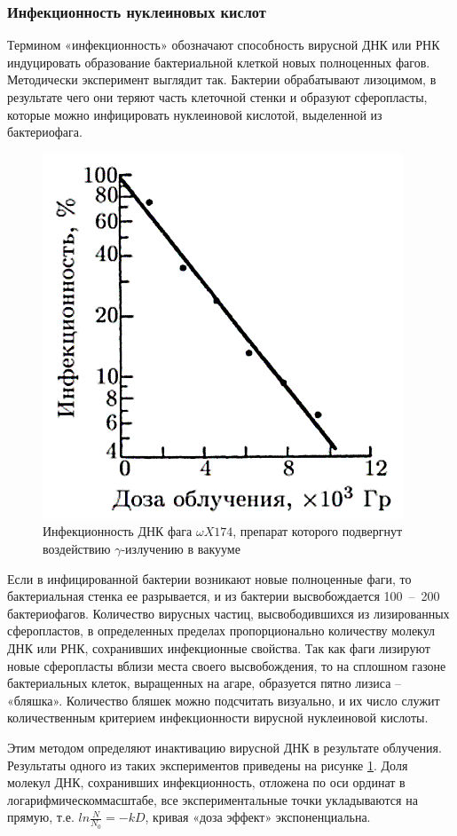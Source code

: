 \documentclass[a4paper, 14pt]{article}
\begin{document}
\subsubsection{Инфекционность нуклеиновых кислот}
Термином «инфекционность» обозначают способность вирусной ДНК или РНК
индуцировать образование бактериальной клеткой новых полноценных фагов.
Методически эксперимент выглядит так. Бактерии обрабатывают лизоцимом, в
результате чего они теряют часть клеточной стенки и образуют сферопласты, которые
можно инфицировать нуклеиновой кислотой, выделенной из бактериофага.
\begin{figure}[htbp]
    \centering
    \includegraphics[width=.5\textwidth]{infectivityOfDNA.png}
    \caption{Инфекционность ДНК фага $\omega X174$, препарат которого подвергнут воздействию $\gamma$-излучению  в вакууме}
    \label{infectivityOfDNA}
\end{figure}
Если в инфицированной бактерии возникают новые полноценные фаги, то бактериальная стенка ее разрывается, и из бактерии высвобождается 100~--~200 бактериофагов. Количество вирусных частиц, высвободившихся из лизированных сферопластов, в определенных пределах пропорционально количеству молекул ДНК или РНК, сохранивших инфекционные свойства. Так как фаги лизируют новые сферопласты вблизи места своего высвобождения, то на сплошном газоне бактериальных клеток, выращенных на агаре, образуется пятно лизиса – «бляшка». Количество бляшек можно подсчитать визуально, и их число служит количественным критерием инфекционности вирусной нуклеиновой кислоты. 

Этим методом определяют инактивацию вирусной ДНК в результате облучения. Результаты одного из таких экспериментов приведены на рисунке \ref{infectivityOfDNA}. Доля молекул ДНК, сохранивших инфекционность, отложена по оси ординат в логарифмическоммасштабе, все экспериментальные точки укладываются на прямую, т.е. $ln \frac{N}{N_0} = -kD$, кривая «доза эффект» экспоненциальна.
\end{document}
